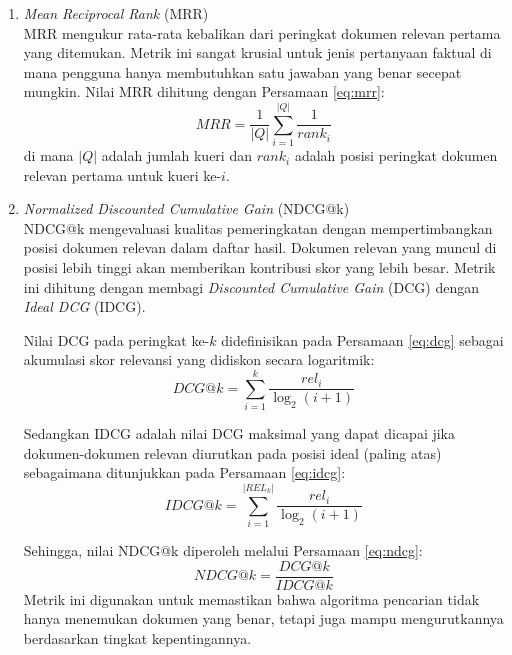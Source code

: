 \begin{enumerate}[noitemsep]
    \item \textit{Mean Reciprocal Rank} (MRR) \\
    MRR mengukur rata-rata kebalikan dari peringkat dokumen relevan pertama yang ditemukan. Metrik ini sangat krusial untuk jenis pertanyaan faktual di mana pengguna hanya membutuhkan satu jawaban yang benar secepat mungkin. Nilai MRR dihitung dengan Persamaan \ref{eq:mrr}:
    \begin{equation}
        MRR = \frac{1}{|Q|} \sum_{i=1}^{|Q|} \frac{1}{rank_i}
        \label{eq:mrr}
    \end{equation}
    di mana $|Q|$ adalah jumlah kueri dan $rank_i$ adalah posisi peringkat dokumen relevan pertama untuk kueri ke-$i$.

    \item \textit{Normalized Discounted Cumulative Gain} (NDCG@k) \\
    NDCG@k mengevaluasi kualitas pemeringkatan dengan mempertimbangkan posisi dokumen relevan dalam daftar hasil. Dokumen relevan yang muncul di posisi lebih tinggi akan memberikan kontribusi skor yang lebih besar. Metrik ini dihitung dengan membagi \textit{Discounted Cumulative Gain} (DCG) dengan \textit{Ideal DCG} (IDCG).

    Nilai DCG pada peringkat ke-$k$ didefinisikan pada Persamaan \ref{eq:dcg} sebagai akumulasi skor relevansi yang didiskon secara logaritmik:
    \begin{equation}
        DCG@k = \sum_{i=1}^{k} \frac{rel_i}{\log_2(i+1)}
        \label{eq:dcg}
    \end{equation}

    Sedangkan IDCG adalah nilai DCG maksimal yang dapat dicapai jika dokumen-dokumen relevan diurutkan pada posisi ideal (paling atas) sebagaimana ditunjukkan pada Persamaan \ref{eq:idcg}:
    \begin{equation}
        IDCG@k = \sum_{i=1}^{|REL_k|} \frac{rel_i}{\log_2(i+1)}
        \label{eq:idcg}
    \end{equation}

    Sehingga, nilai NDCG@k diperoleh melalui Persamaan \ref{eq:ndcg}:
    \begin{equation}
        NDCG@k = \frac{DCG@k}{IDCG@k}
        \label{eq:ndcg}
    \end{equation}
    Metrik ini digunakan untuk memastikan bahwa algoritma pencarian tidak hanya menemukan dokumen yang benar, tetapi juga mampu mengurutkannya berdasarkan tingkat kepentingannya.


\end{enumerate}
